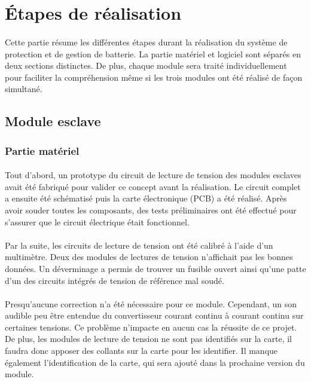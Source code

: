 \section{Étapes de réalisation}

	\paragraph{}
	Cette partie résume les différentes étapes durant la réalisation du système de protection et de gestion de batterie. La partie matériel et logiciel sont séparés en deux sections distinctes. De plus, chaque module sera traité individuellement pour faciliter la compréhension même si les trois modules ont été réalisé de façon simultané.

	\subsection{Module esclave}

		\subsubsection{Partie matériel}

			\paragraph{}
			Tout d’abord, un prototype du circuit de lecture de tension des modules esclaves avait été fabriqué pour valider ce concept avant la réalisation. Le circuit complet a ensuite été schématisé puis la carte électronique (PCB) a été réalisé. Après avoir souder toutes les composants, des tests préliminaires ont été effectué pour s’assurer que le circuit électrique était fonctionnel.

			\paragraph{}
			Par la suite, les circuits de lecture de tension ont été calibré à l’aide d’un multimètre. Deux des modules de lectures de tension n’affichait pas les bonnes données. Un déverminage a permis de trouver un fusible ouvert ainsi qu'une patte d'un des circuits intégrés de tension de référence mal soudé.

			\paragraph{}
			Presqu’aucune correction n’a été nécessaire pour ce module. Cependant, un son audible peu être entendue du convertisseur courant continu à courant continu sur certaines tensions. Ce problème n’impacte en aucun cas la réussite de ce projet. De plus, les modules de lecture de tension ne sont pas identifiés sur la carte, il faudra donc apposer des collants sur la carte pour les identifier. Il manque également l’identification de la carte, qui sera ajouté dans la prochaine version du module.


